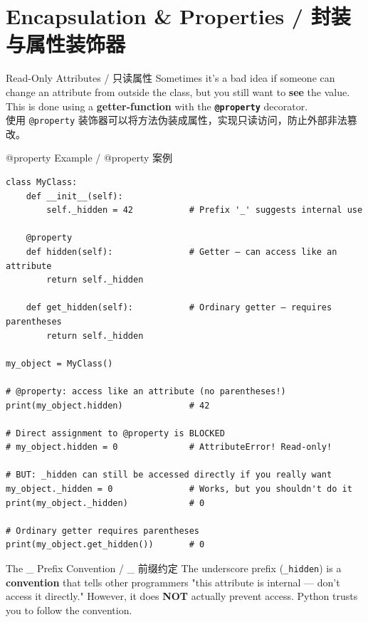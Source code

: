 \documentclass[11pt,a4paper]{report}
\let\oldtexttt\texttt
\renewcommand{\texttt}[1]{\textcolor{mainblue}{\oldtexttt{#1}}}
\begin{document}
\section{Encapsulation \& Properties / 封装与属性装饰器}

\begin{concept}{Read-Only Attributes / 只读属性}
    Sometimes it's a bad idea if someone can change an attribute from outside the class, but you still want to \textbf{see} the value. This is done using a \textbf{getter-function} with the \textbf{\texttt{@property}} decorator. \\
    使用 \texttt{@property} 装饰器可以将方法伪装成属性，实现只读访问，防止外部非法篡改。
\end{concept}

\begin{examplebox}{@property Example / @property 案例}
\begin{lstlisting}
class MyClass:
    def __init__(self):
        self._hidden = 42           # Prefix '_' suggests internal use

    @property
    def hidden(self):               # Getter — can access like an attribute
        return self._hidden

    def get_hidden(self):           # Ordinary getter — requires parentheses
        return self._hidden

my_object = MyClass()

# @property: access like an attribute (no parentheses!)
print(my_object.hidden)             # 42

# Direct assignment to @property is BLOCKED
# my_object.hidden = 0              # AttributeError! Read-only!

# BUT: _hidden can still be accessed directly if you really want
my_object._hidden = 0               # Works, but you shouldn't do it
print(my_object._hidden)            # 0

# Ordinary getter requires parentheses
print(my_object.get_hidden())       # 0
\end{lstlisting}
\end{examplebox}

\begin{warning}{The \_ Prefix Convention / \_ 前缀约定}
    The underscore prefix (\texttt{\_hidden}) is a \textbf{convention} that tells other programmers "this attribute is internal — don't access it directly." However, it does \textbf{NOT} actually prevent access. Python trusts you to follow the convention.
\end{warning}
\end{document}
